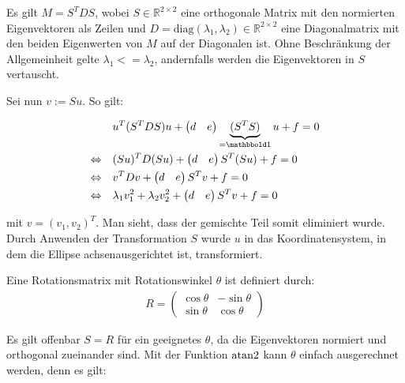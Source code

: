 Es gilt $M = S^TDS$, wobei $S\in\mathbb{R}^{2\times2}$ eine orthogonale Matrix mit den normierten Eigenvektoren als Zeilen und $D = \text{diag}(\lambda_1, \lambda_2)\in\mathbb{R}^{2\times2}$ eine Diagonalmatrix mit den beiden Eigenwerten von $M$ auf der Diagonalen ist. Ohne Beschränkung der Allgemeinheit gelte $\lambda_1 <= \lambda_2$, andernfalls werden die Eigenvektoren in $S$ vertauscht.

Sei nun $v := Su$.
So gilt:

\begin{equation} \label{eq:PCARot}
\begin{aligned}
&u^T(S^TDS)u +\begin{pmatrix}d & e\end{pmatrix}\underbrace{(S^TS)}_{=\ind}u + f = 0 \\
\Leftrightarrow\quad &(Su)^TD(Su) +\begin{pmatrix}d & e\end{pmatrix}S^T(Su) + f = 0 \\
\Leftrightarrow\quad &v^{T}Dv +\begin{pmatrix}d & e\end{pmatrix}S^Tv + f = 0 \\
\Leftrightarrow\quad &\lambda_1v_1^2 + \lambda_2v_2^2 +\begin{pmatrix}d & e\end{pmatrix}S^Tv + f = 0
\end{aligned}
\end{equation}

mit $v = (v_1,v_2)^T$. Man sieht, dass der gemischte Teil somit eliminiert wurde. Durch Anwenden der Transformation $S$ wurde $u$ in das Koordinatensystem, in dem die Ellipse achsenausgerichtet ist,  transformiert.

Eine Rotationsmatrix mit Rotationswinkel $\theta$ ist definiert durch:
\begin{equation}
\begin{aligned}
R = \begin{pmatrix}\cos\theta & -\sin\theta \\ \sin\theta & \cos\theta\end{pmatrix}
\end{aligned}
\end{equation}

Es gilt offenbar $S = R$ für ein geeignetes $\theta$, da die Eigenvektoren normiert und orthogonal zueinander sind. Mit der Funktion $\text{atan2}$ kann $\theta$ einfach ausgerechnet werden, denn es gilt:

